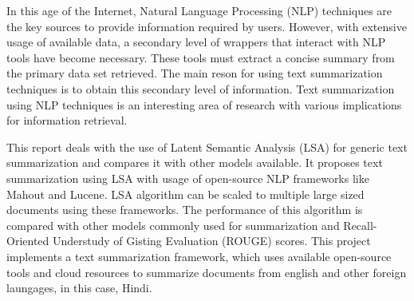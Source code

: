 \begin{abstractpage}
In this age of the Internet, Natural Language Processing (NLP) techniques are the key sources to provide information
required by users. However, with extensive usage of available data, a secondary level of wrappers that interact with NLP
tools have become necessary. These tools must extract a concise summary from the primary data set retrieved. 
The main reson for using text summarization techniques is to obtain this secondary level of information.
Text summarization using NLP techniques is an interesting area of research with various implications for information retrieval. 

	This report deals with the use of Latent Semantic Analysis (LSA) for generic text summarization and compares 
it with other models available. It proposes text summarization using LSA with usage of open-source NLP frameworks 
like Mahout and Lucene. LSA algorithm can be scaled to multiple large sized documents using these frameworks.
The performance of this algorithm is compared with other models commonly used for summarization and Recall-Oriented
Understudy of Gisting Evaluation (ROUGE) scores.  This project implements a text summarization framework, which uses available
open-source tools and cloud resources to summarize documents from english and other foreign laungages,
in this case, Hindi.
\end{abstractpage}